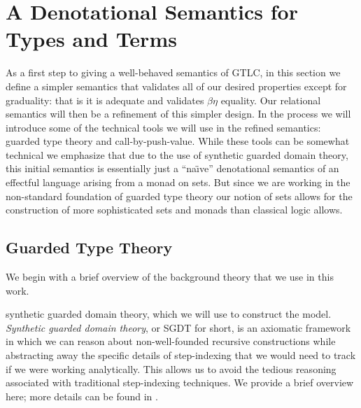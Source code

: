 \section{A Denotational Semantics for Types and Terms}\label{sec:concrete-term-model}

As a first step to giving a well-behaved semantics of GTLC, in this
section we define a simpler semantics that validates all of our
desired properties except for graduality: that is it is adequate and
validates $\beta\eta$ equality. Our relational semantics will then be
a refinement of this simpler design. In the process we will introduce
some of the technical tools we will use in the refined semantics:
guarded type theory and call-by-push-value. While these tools can be
somewhat technical we emphasize that due to the use of synthetic
guarded domain theory, this initial semantics is essentially just a
``na\"\i ve'' denotational semantics of an effectful language arising
from a monad on sets. But since we are working in the non-standard
foundation of guarded type theory our notion of sets allows for the
construction of more sophisticated sets and monads than classical
logic allows.

%

\subsection{Guarded Type Theory}

We begin with a brief overview of the background theory that we use in this work.

synthetic guarded domain theory, which we will
use to construct the model. \emph{Synthetic guarded domain theory}, or SGDT for
short, is an axiomatic framework in which we can reason about non-well-founded
recursive constructions while abstracting away the specific details of
step-indexing that we would need to track if we were working analytically. This
allows us to avoid the tedious reasoning associated with traditional
step-indexing techniques. We provide a brief overview here; more details can be
found in \cite{birkedal-mogelberg-schwinghammer-stovring2011}.

